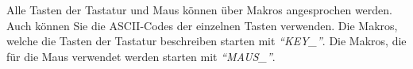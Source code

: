 Alle Tasten der Tastatur und Maus können über Makros angesprochen werden. Auch können Sie die ASCII-Codes der einzelnen Tasten verwenden. Die Makros, welche die Tasten der Tastatur beschreiben starten mit \textit{"`KEY\_"'}. Die Makros, die für die Maus verwendet werden starten mit \textit{"`MAUS\_"'}.
